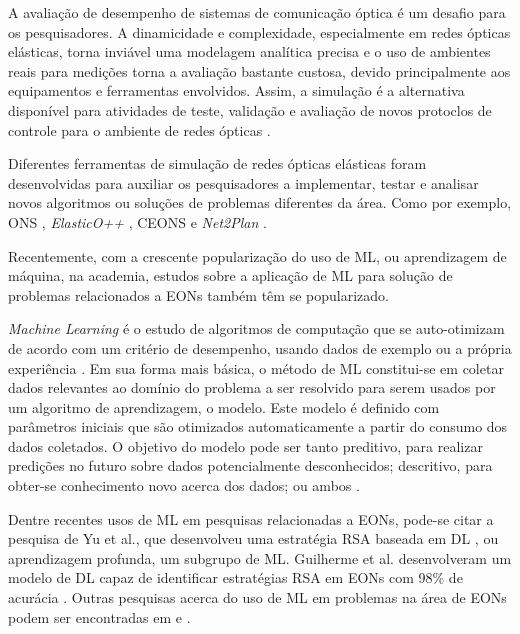 A avaliação de desempenho de sistemas de comunicação óptica é um desafio para os pesquisadores. A dinamicidade e complexidade, especialmente em redes ópticas elásticas, torna inviável uma modelagem analítica precisa e o uso de ambientes reais para medições torna a avaliação bastante custosa, devido principalmente aos equipamentos e ferramentas envolvidos. Assim, a simulação é a alternativa disponível para atividades de teste, validação e avaliação de novos protoclos de controle para o ambiente de redes ópticas \cite{costa2016ons}.

Diferentes ferramentas de simulação de redes ópticas elásticas foram desenvolvidas para auxiliar os pesquisadores a implementar, testar e analisar novos algoritmos ou soluções de problemas diferentes da área. Como por exemplo, \acrfull{ONS} \cite{costa2016ons}, \textit{ElasticO++} \cite{TESSINARI201695}, \acrfull{CEONS} \cite{ceons2015} e \textit{Net2Plan} \cite{net2plan}.

Recentemente, com a crescente popularização do uso de \acrfull{ML}, ou aprendizagem de máquina, na academia, estudos sobre a aplicação de ML para solução de problemas relacionados a EONs também têm se popularizado.

\textit{Machine Learning} é o estudo de algoritmos de computação que se auto-otimizam de acordo com um critério de desempenho, usando dados de exemplo ou a própria experiência \cite{mitchell1997ml, alpaydin2020introduction}. Em sua forma mais básica, o método de ML constitui-se em coletar dados relevantes ao domínio do problema a ser resolvido para serem usados por um algoritmo de aprendizagem, o modelo. Este modelo é definido com parâmetros iniciais que são otimizados automaticamente a partir do consumo dos dados coletados. O objetivo do modelo pode ser tanto preditivo, para realizar predições no futuro sobre dados potencialmente desconhecidos; descritivo, para obter-se conhecimento novo acerca dos dados; ou ambos \cite{alpaydin2020introduction, brief_introduction_to_ml}.

Dentre recentes usos de ML em pesquisas relacionadas a EONs, pode-se citar a pesquisa de Yu et al., que desenvolveu uma estratégia RSA baseada em \acrfull{DL} \cite{eon_ml_rsa_dl_2019}, ou aprendizagem profunda, um subgrupo de ML. Guilherme et al. desenvolveram um modelo de DL capaz de identificar estratégias RSA em EONs com 98\% de acurácia \cite{eon_ml_classifier_2020}. Outras pesquisas acerca do uso de ML em problemas na área de EONs podem ser encontradas em \cite{eon_ml_recent_2019} e \cite{eon_ml_survey_2020}.

